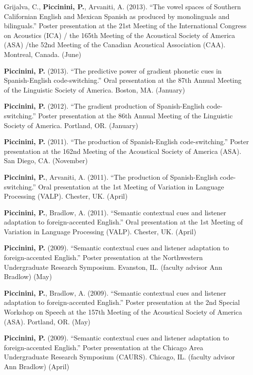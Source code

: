 \documentclass[9pt]{article}
\newenvironment{changemargin}[2]{%
  \begin{list}{}{%
    \setlength{\topsep}{0pt}%
    \setlength{\leftmargin}{#1}%
    \setlength{\rightmargin}{#2}%
    \setlength{\listparindent}{\parindent}%
    \setlength{\itemindent}{\parindent}%
    \setlength{\parsep}{\parskip}%
  }%
  \item[]}{\end{list}
}
\newenvironment{body} {
	\vspace*{-16pt}
	\begin{changemargin}{-0.25in}{-0.5in}
  }	
	{\end{changemargin}
}
\begin{document}
\begin{body}
	Grijalva, C., \textbf{Piccinini, P.}, Arvaniti, A. (2013). ``The vowel spaces of Southern Californian English and Mexican Spanish as produced by monolinguals and bilinguals.'' Poster presentation at the 21st Meeting of the International Congress on Acoustics (ICA) / the 165th Meeting of the Acoustical Society of America (ASA) /the 52nd Meeting of the Canadian Acoustical Association (CAA). Montreal, Canada. (June)\\
	\medskip
			
	\textbf{Piccinini, P.} (2013). ``The predictive power of gradient phonetic cues in Spanish-English code-switching.'' Oral presentation at the 87th Annual Meeting of the Linguistic Society of America. Boston, MA. (January)\\
	\medskip
			
	\textbf{Piccinini, P.} (2012). ``The gradient production of Spanish-English code-switching.'' Poster presentation at the 86th Annual Meeting of the Linguistic Society of America. Portland, OR. (January)\\
	\medskip
			
	\textbf{Piccinini, P.} (2011). ``The production of Spanish-English code-switching.'' Poster presentation at the 162nd Meeting of the Acoustical Society of America (ASA). San Diego, CA. (November)\\
	\medskip
	
	\textbf{Piccinini, P.}, Arvaniti, A. (2011). ``The production of Spanish-English code-switching.'' Oral presentation at the 1st Meeting of Variation in Language Processing (VALP). Chester, UK. (April)\\
	\medskip	

	\textbf{Piccinini, P.}, Bradlow, A. (2011). ``Semantic contextual cues and listener adaptation to foreign-accented English.'' Oral presentation at the 1st Meeting of Variation in Language Processing (VALP). Chester, UK. (April)\\
	\medskip	

	\textbf{Piccinini, P.} (2009). ``Semantic contextual cues and listener adaptation to foreign-accented English.'' Poster presentation at the Northwestern Undergraduate Research Symposium. Evanston, IL. (faculty advisor Ann Bradlow) (May)\\
	\medskip	
	
	\textbf{Piccinini, P.}, Bradlow, A. (2009). ``Semantic contextual cues and listener adaptation to foreign-accented English.'' Poster presentation at the 2nd Special Workshop on Speech at the 157th Meeting of the Acoustical Society of America (ASA). Portland, OR. (May)\\
	\medskip
	
	\textbf{Piccinini, P.} (2009). ``Semantic contextual cues and listener adaptation to foreign-accented English.'' Poster presentation at the Chicago Area Undergraduate Research Symposium (CAURS). Chicago, IL. (faculty advisor Ann Bradlow) (April)\\
	
\end{body}
\end{document}

